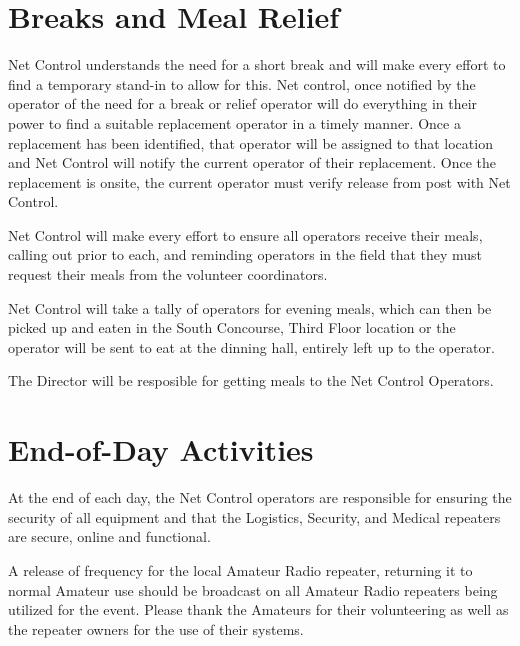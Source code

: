 \documentclass[pdflatex,letterpaper,twoside,12pt]{book}
\begin{document}

\section{Breaks and Meal Relief}

Net Control understands the need for a short break and will make every effort to find a temporary stand-in to allow for this.  Net control, once notified by the operator of the need for a break or relief operator will do everything in their power to find a suitable replacement operator in a timely manner.  Once a replacement has been identified, that operator will be assigned to that location and Net Control will notify the current operator of their replacement.  Once the replacement is onsite, the current operator must verify release from post with Net Control.

Net Control will make every effort to ensure all operators receive their meals, calling out prior to each, and reminding operators in the field that they must request their meals from the volunteer coordinators.

Net Control will take a tally of operators for evening meals, which can then be picked up and eaten in the South Concourse, Third Floor location or the operator will be sent to eat at the dinning hall, entirely left up to the operator.

The Director will be resposible for getting meals to the Net Control Operators.


\section{End-of-Day Activities}

At the end of each day, the Net Control operators are responsible for ensuring the security of all equipment and that the Logistics, Security, and Medical repeaters are secure, online and functional.

A release of frequency for the local Amateur Radio repeater, returning it to normal Amateur use should be broadcast on all Amateur Radio repeaters being utilized for the event. Please thank the Amateurs for their volunteering as well as the repeater owners for the use of their systems.
\end{document}
